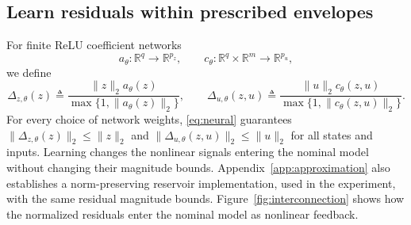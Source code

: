 \documentclass{l4dc2027}
\newcommand{\R}{\mathbb R}
\newcommand{\eqdef}{\triangleq}
\begin{document}
\subsection{Learn residuals within prescribed envelopes}
For finite ReLU coefficient networks
\[
 a_\theta:\R^q\to\R^{p_z},\qquad
 c_\theta:\R^q\times\R^m\to\R^{p_u},
\]
we define
\begin{equation}\label{eq:neural}
 \Delta_{z,\theta}(z)\eqdef
 \frac{\|z\|_2a_\theta(z)}{\max\{1,\|a_\theta(z)\|_2\}},
 \qquad
 \Delta_{u,\theta}(z,u)\eqdef
 \frac{\|u\|_2c_\theta(z,u)}{\max\{1,\|c_\theta(z,u)\|_2\}}.
\end{equation}
For every choice of network weights, \eqref{eq:neural} guarantees \mbox{$\|\Delta_{z,\theta}(z)\|_2\le\|z\|_2$} and \mbox{$\|\Delta_{u,\theta}(z,u)\|_2\le\|u\|_2$} for all states and inputs.
Learning changes the nonlinear signals entering the nominal model without changing their magnitude bounds.
Appendix~\ref{app:approximation} also establishes a norm-preserving reservoir implementation, used in the experiment, with the same residual magnitude bounds.
Figure~\ref{fig:interconnection} shows how the normalized residuals enter the nominal model as nonlinear feedback.
\end{document}
